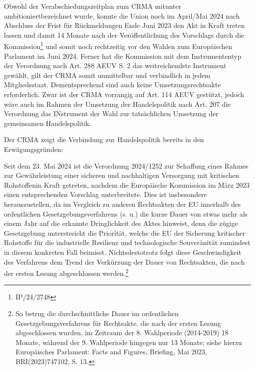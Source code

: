 \documentclass[12pt,a4paper,oneside]{book} %
\begin{document}

Obwohl der Verabschiedungszeitplan zum CRMA mitunter \glqq ambitioniert\grqq bezeichnet wurde, konnte die Union noch im April/Mai 2024 nach Abschluss der Frist für Rückmeldungen Ende Juni 2023 den Akt in Kraft treten lassen und damit 14 Monate nach der Veröffentlichung des Vorschlags durch die Kommission\footnote{IP/24/2748} und somit noch rechtzeitig vor den Wahlen zum Europäischen Parlament im Juni 2024. Ferner hat die Kommission mit dem Instrumententyp der Verordnung nach Art. 288 AEUV S. 2 das weitreichendste Instrument gewählt, gilt der CRMA somit unmittelbar und verbindlich in jedem Mitgliedsstaat. Dementsprechend sind auch keine Umsetzungsrechtsakte erforderlich. Zwar ist der CRMA vorrangig auf Art. 114 AEUV gestützt, jedoch wäre auch im Rahmen der Umsetzung der Handelspolitik nach Art. 207 die Verordnung das INstrument der Wahl zur tatsächlichen Umsetzung der gemeinsamen Handelspolitik.\autocite{RdTW 2024, 216}

Der CRMA zeigt die Verbindung zur Handelspolitik bereits in den Erwägungsgründen: 



Seit dem 23. Mai 2024 ist die Verordnung 2024/1252 \glqq zur Schaffung eines Rahmes zur Gewährleistung einer sicheren und nachhaltigen Versorgung mit kritischen Rohstoffen\grqq in Kraft getreten, nachdem die Europäische Kommission im März 2023 einen entsprechenden Vorschlag unterbreitete. Dies ist insbesondere herauszustellen, da im Vergleich zu anderen Rechtsakten der EU innerhalb des ordentlichen Gesetzgebungsverfahrens (s. u.) die kurze Dauer von etwas mehr als einem Jahr auf die erkannte Dringlichkeit des Aktes hinweist, denn die zügige Gesetzgebung unterstreicht die Priorität, welche die EU der Sicherung kritischer Rohstoffe für die industrielle Resilienz und technologische Souveränität zumindest in diesem konkreten Fall beimisst. Nichtsdestotrotz folgt diese Geschwindigkeit des Verfahrens dem Trend der Verkürzung der Dauer von Rechtsakten, die nach der ersten Lesung abgeschlossen werden.\footnote{So betrug die durchschnittliche Dauer im ordentlichen Gesetzgebungsverfahrens für Rechtsakte, die nach der ersten Lesung abgeschlossen wurden, im Zeitraum der 8. Wahlperiode (2014-2019) 18 Monate, während der 9. Wahlperiode hingegen nur 13 Monate; siehe hierzu Europäisches Parlament: Facts and Figures, Briefing, Mai 2023, BRI(2023)747102, S. 13.} 
\end{document}
